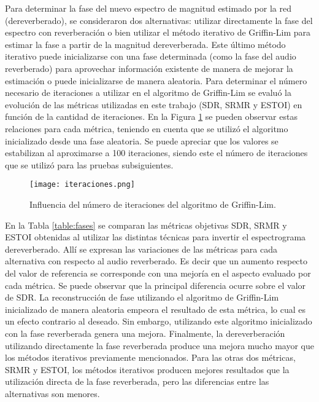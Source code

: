 Para determinar la fase del nuevo espectro de magnitud estimado por la red (dereverberado), se consideraron dos alternativas: utilizar directamente la fase del espectro con reverberación o bien utilizar el método iterativo de Griffin-Lim para estimar la fase a partir de la magnitud dereverberada. Este último método iterativo puede inicializarse con una fase determinada (como la fase del audio reverberado) para aprovechar información existente de manera de mejorar la estimación o puede inicializarse de manera aleatoria. 
Para determinar el número necesario de iteraciones a utilizar en el algoritmo de Griffin-Lim se evaluó la evolución de las métricas utilizadas en este trabajo (SDR, SRMR y ESTOI) en función de la cantidad de iteraciones. En la Figura \ref{fig:iteraciones} se pueden observar estas relaciones para cada métrica, teniendo en cuenta que se utilizó el algoritmo inicializado desde una fase aleatoria. Se puede apreciar que los valores se estabilizan al aproximarse a 100 iteraciones, siendo este el número de iteraciones que se utilizó para las pruebas subsiguientes.     

\begin{figure}[H]
	\centering{}
	\texttt{[image: iteraciones.png]}
	\caption{Influencia del número de iteraciones del algoritmo de Griffin-Lim.}
	\label{fig:iteraciones}
\end{figure}

En la Tabla \ref{table:fases} se comparan las métricas objetivas SDR, SRMR y ESTOI obtenidas al utilizar las distintas técnicas para invertir el espectrograma dereverberado. Allí se expresan las variaciones de las métricas para cada alternativa con respecto al audio reverberado. Es decir que un aumento respecto del valor de referencia se corresponde con una mejoría en el aspecto evaluado por cada métrica. Se puede observar que la principal diferencia ocurre sobre el valor de SDR. La reconstrucción de fase utilizando el algoritmo de Griffin-Lim inicializado de manera aleatoria empeora el resultado de esta métrica, lo cual es un efecto contrario al deseado. Sin embargo, utilizando este algoritmo inicializado con la fase reverberada genera una mejora. Finalmente, la dereverberación utilizando directamente la fase reverberada produce una mejora mucho mayor que los métodos iterativos previamente mencionados. Para las otras dos métricas, SRMR y ESTOI, los métodos iterativos producen mejores resultados que la utilización directa de la fase reverberada, pero las diferencias entre las alternativas son menores.

